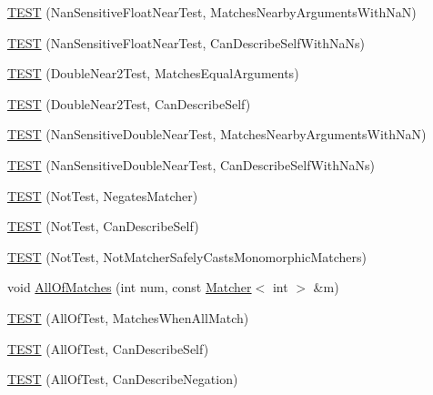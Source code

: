 \begin{DoxyCompactItemize}
\mbox{\hyperlink{namespacetesting_1_1gmock__matchers__test_a120a3f5e18772202f60c2b32ae0bc6b3}{T\+E\+ST}} (Nan\+Sensitive\+Float\+Near\+Test, Matches\+Nearby\+Arguments\+With\+NaN)
\item 
\mbox{\hyperlink{namespacetesting_1_1gmock__matchers__test_a7d029a5d7ca6bc503227f7c34a5e20e2}{T\+E\+ST}} (Nan\+Sensitive\+Float\+Near\+Test, Can\+Describe\+Self\+With\+Na\+Ns)
\item 
\mbox{\hyperlink{namespacetesting_1_1gmock__matchers__test_aa7589c5d34e5aae4031e5e0fac29c9f5}{T\+E\+ST}} (Double\+Near2\+Test, Matches\+Equal\+Arguments)
\item 
\mbox{\hyperlink{namespacetesting_1_1gmock__matchers__test_a6f3834a4f5028027db270e7f3e0052f6}{T\+E\+ST}} (Double\+Near2\+Test, Can\+Describe\+Self)
\item 
\mbox{\hyperlink{namespacetesting_1_1gmock__matchers__test_a29c16f71a512c1f7906f54167c6bd6ab}{T\+E\+ST}} (Nan\+Sensitive\+Double\+Near\+Test, Matches\+Nearby\+Arguments\+With\+NaN)
\item 
\mbox{\hyperlink{namespacetesting_1_1gmock__matchers__test_a873b74c264015e8e2bb1a1f693f4cf88}{T\+E\+ST}} (Nan\+Sensitive\+Double\+Near\+Test, Can\+Describe\+Self\+With\+Na\+Ns)
\item 
\mbox{\hyperlink{namespacetesting_1_1gmock__matchers__test_ab41b57eeaea5568064b6ed3725316c73}{T\+E\+ST}} (Not\+Test, Negates\+Matcher)
\item 
\mbox{\hyperlink{namespacetesting_1_1gmock__matchers__test_a831db2bf90c3950953cdceaefebddd40}{T\+E\+ST}} (Not\+Test, Can\+Describe\+Self)
\item 
\mbox{\hyperlink{namespacetesting_1_1gmock__matchers__test_a46849e0c019e331f830ed91137fa417a}{T\+E\+ST}} (Not\+Test, Not\+Matcher\+Safely\+Casts\+Monomorphic\+Matchers)
\item 
void \mbox{\hyperlink{namespacetesting_1_1gmock__matchers__test_a51d8731c3824a6acdaa594645dd46779}{All\+Of\+Matches}} (int num, const \mbox{\hyperlink{classtesting_1_1Matcher}{Matcher}}$<$ int $>$ \&m)
\item 
\mbox{\hyperlink{namespacetesting_1_1gmock__matchers__test_a7714d041eb2dd2e233db7f175fedef5a}{T\+E\+ST}} (All\+Of\+Test, Matches\+When\+All\+Match)
\item 
\mbox{\hyperlink{namespacetesting_1_1gmock__matchers__test_a31056975d89eea2786997cf18b086bf4}{T\+E\+ST}} (All\+Of\+Test, Can\+Describe\+Self)
\item 
\mbox{\hyperlink{namespacetesting_1_1gmock__matchers__test_a86c15b3bc163321c7a56aeb0b1709b87}{T\+E\+ST}} (All\+Of\+Test, Can\+Describe\+Negation)

\end{DoxyCompactItemize}
